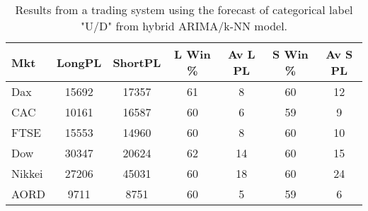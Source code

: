 \begin{table}[ht]
\centering
\caption[Results from a trading system using the forecast of categorical label "U/D" from hybrid ARIMA/k-NN model]{Results from a trading system using the forecast of categorical label "U/D" from hybrid ARIMA/k-NN model.} 
\label{tab:chp_ts:pUD_CAT_arima_knn_sys}
\begin{tabular}{lcccccc}
  \toprule Mkt & LongPL & ShortPL & L Win \% & Av L PL & S Win \% & Av S PL \\ 
  \midrule Dax & 15692 & 17357 & 61 & 8 & 60 & 12 \\ 
  CAC & 10161 & 16587 & 60 & 6 & 59 & 9 \\ 
  FTSE & 15553 & 14960 & 60 & 8 & 60 & 10 \\ 
  Dow & 30347 & 20624 & 62 & 14 & 60 & 15 \\ 
  Nikkei & 27206 & 45031 & 60 & 18 & 60 & 24 \\ 
  AORD & 9711 & 8751 & 60 & 5 & 59 & 6 \\ 
   \bottomrule \end{tabular}
\end{table}
